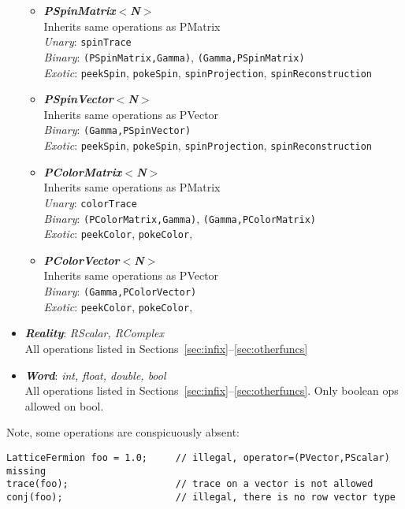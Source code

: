 \documentclass[12pt,letterpaper]{article}
\begin{document}
\begin{itemize}
\begin{itemize}
\item
{\bf\em PSpinMatrix$<$N$>$}\\
  Inherits same operations as PMatrix\\
  {\em Unary}: {\tt spinTrace}\\
  {\em Binary}: {\tt *(PSpinMatrix,Gamma)}, {\tt *(Gamma,PSpinMatrix)}\\
  {\em Exotic}: {\tt peekSpin}, {\tt pokeSpin}, {\tt spinProjection}, 
      {\tt spinReconstruction}

\item
{\bf\em PSpinVector$<$N$>$}\\
  Inherits same operations as PVector\\
  {\em Binary}: {\tt *(Gamma,PSpinVector)}\\
  {\em Exotic}: {\tt peekSpin}, {\tt pokeSpin}, {\tt spinProjection}, 
      {\tt spinReconstruction}

\item
{\bf\em PColorMatrix$<$N$>$}\\
  Inherits same operations as PMatrix\\
  {\em Unary}: {\tt colorTrace}\\
  {\em Binary}: {\tt *(PColorMatrix,Gamma)}, {\tt *(Gamma,PColorMatrix)}\\
  {\em Exotic}: {\tt peekColor}, {\tt pokeColor}, 

\item
{\bf\em PColorVector$<$N$>$}\\
  Inherits same operations as PVector\\
  {\em Binary}: {\tt *(Gamma,PColorVector)}\\
  {\em Exotic}: {\tt peekColor}, {\tt pokeColor}, 

\end{itemize}  %

\item
{\bf\em Reality}: {\em RScalar, RComplex}\\
All operations listed in Sections~\ref{sec:infix}--\ref{sec:otherfuncs}

\item
{\bf\em Word}: {\em int, float, double, bool}\\
All operations listed in Sections~\ref{sec:infix}--\ref{sec:otherfuncs}.
Only boolean ops allowed on bool.


\end{itemize}  %


Note, some operations are conspicuously absent:
\begin{verbatim}
LatticeFermion foo = 1.0;     // illegal, operator=(PVector,PScalar) missing
trace(foo);                   // trace on a vector is not allowed
conj(foo);                    // illegal, there is no row vector type
\end{verbatim}
\end{document}
